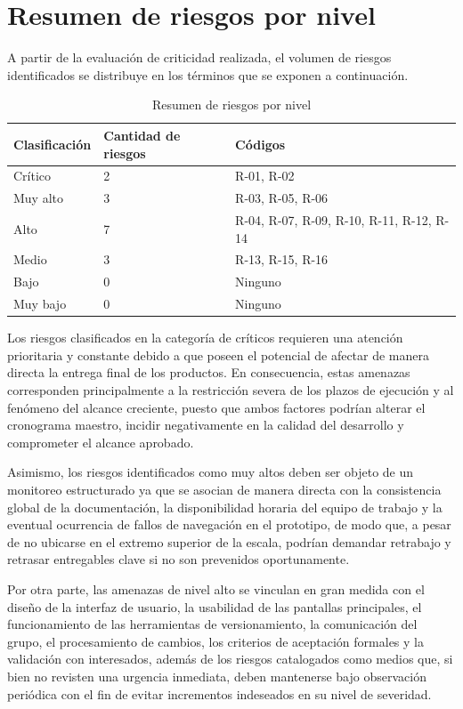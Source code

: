 \documentclass[11pt,spanish]{article}
\begin{document}
\section{Resumen de riesgos por nivel}

A partir de la evaluación de criticidad realizada, el volumen de riesgos identificados se distribuye en los términos que se exponen a continuación.

\begin{table}[H]
\centering
\caption{Resumen de riesgos por nivel}
\label{tab-resumen-riesgos}
{\small
\begin{tabularx}{\textwidth}{p{3.5cm} p{3.2cm} Y}
\toprule
\textbf{Clasificación} & \textbf{Cantidad de riesgos} & \textbf{Códigos} \\
\midrule
Crítico & 2 & R-01, R-02 \\
Muy alto & 3 & R-03, R-05, R-06 \\
Alto & 7 & R-04, R-07, R-09, R-10, R-11, R-12, R-14 \\
Medio & 3 & R-13, R-15, R-16 \\
Bajo & 0 & Ninguno \\
Muy bajo & 0 & Ninguno \\
\bottomrule
\end{tabularx}
}
\end{table}

Los riesgos clasificados en la categoría de críticos requieren una atención prioritaria y constante debido a que poseen el potencial de afectar de manera directa la entrega final de los productos. En consecuencia, estas amenazas corresponden principalmente a la restricción severa de los plazos de ejecución y al fenómeno del alcance creciente, puesto que ambos factores podrían alterar el cronograma maestro, incidir negativamente en la calidad del desarrollo y comprometer el alcance aprobado.

Asimismo, los riesgos identificados como muy altos deben ser objeto de un monitoreo estructurado ya que se asocian de manera directa con la consistencia global de la documentación, la disponibilidad horaria del equipo de trabajo y la eventual ocurrencia de fallos de navegación en el prototipo, de modo que, a pesar de no ubicarse en el extremo superior de la escala, podrían demandar retrabajo y retrasar entregables clave si no son prevenidos oportunamente.

Por otra parte, las amenazas de nivel alto se vinculan en gran medida con el diseño de la interfaz de usuario, la usabilidad de las pantallas principales, el funcionamiento de las herramientas de versionamiento, la comunicación del grupo, el procesamiento de cambios, los criterios de aceptación formales y la validación con interesados, además de los riesgos catalogados como medios que, si bien no revisten una urgencia inmediata, deben mantenerse bajo observación periódica con el fin de evitar incrementos indeseados en su nivel de severidad.
\end{document}
